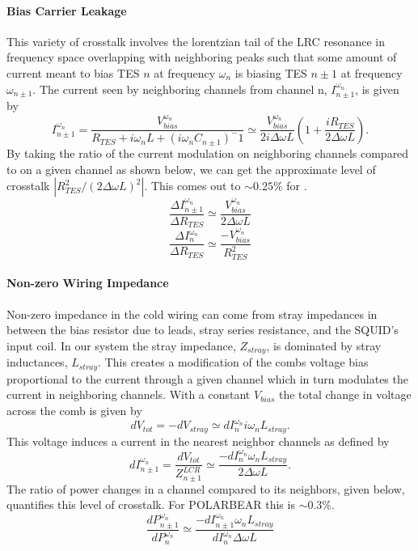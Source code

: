 \setcounter{equation}{0}
\paragraph{Bias Carrier Leakage}
This variety of crosstalk involves the lorentzian tail of the LRC resonance in frequency space overlapping with neighboring peaks such that some amount of current meant to bias TES $n$ at frequency $\omega_n$ is biasing TES $n\pm1$ at frequency $\omega_{n\pm1}$. The current seen by neighboring channels from channel n, $I^{\omega_n}_{n\pm1}$, is given by
\begin{equation}
I^{\omega_n}_{n\pm1} = \frac{V^{\omega_n}_{bias}}{R_{TES}+i\omega_nL+(i\omega_nC_{n\pm1})^-1} \simeq \frac{V^{\omega_n}_{bias}}{2i\Delta\omega L}\left(1+\frac{iR_{TES}}{2\Delta\omega L}\right).
\end{equation}
By taking the ratio of the current modulation on neighboring channels compared to on a given channel as shown below, we can get the approximate level of crosstalk $|R^2_{TES}/(2\Delta \omega L)^2|$. This comes out to $\sim0.25\%$ for \pb.
\begin{equation}
\frac{\Delta I^{\omega_n}_{n\pm1}}{\Delta R_{TES}} \simeq \frac{V^{\omega_n}_{bias}}{2\Delta\omega L}
\end{equation}
\begin{equation}
\frac{\Delta I^{\omega_n}_{n}}{\Delta R_{TES}} \simeq \frac{-V^{\omega_n}_{bias}}{R^2_{TES}}
\end{equation}

\paragraph{Non-zero Wiring Impedance}
Non-zero impedance in the cold wiring can come from stray impedances in between the bias resistor due to leads, stray series resistance, and the SQUID's input coil. In our system the stray impedance, $Z_{stray}$, is dominated by stray inductances, $L_{stray}$. This creates a modification of the combs voltage bias proportional to the current through a given channel which in turn modulates the current in neighboring channels. With a constant $V_{bias}$ the total change in voltage across the comb is given by
\begin{equation}
dV_{tot}=-dV_{stray}\simeq dI^{\omega_n}_{n}i\omega_nL_{stray}.
\end{equation}
This voltage induces a current in the nearest neighbor channels as defined by
\begin{equation}
dI^{\omega_n}_{n\pm1}=\frac{dV_{tot}}{Z^{LCR}_{n\pm1}}\simeq \frac{-dI^{\omega_n}_{n}\omega_nL_{stray}}{2\Delta \omega L}.
\end{equation}
The ratio of power changes in a channel compared to its neighbors, given below, quantifies this level of crosstalk. For POLARBEAR this is $\sim0.3\%$.
\begin{equation}
\frac{dP^{\omega_n}_{n\pm1}}{dP^{\omega_n}_{n}}\simeq \frac{-dI^{\omega_n}_{n\pm1}\omega_nL_{stray}}{dI^{\omega_n}_{n}\Delta\omega L}
\end{equation}
